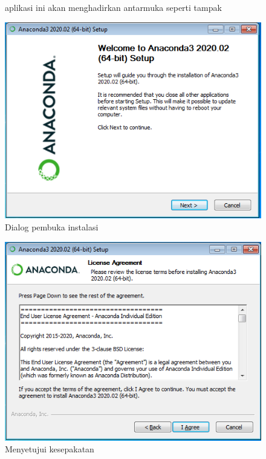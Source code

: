 \begin{figure}aplikasi ini akan menghadirkan antarmuka seperti tampak
  \begin{center}
    \includegraphics[scale=.5]{pics/anacondaInstall1.png}
    \caption{Dialog pembuka instalasi}
    \label{fig:pembuka}
  \end{center}
\end{figure}

\begin{figure}[h!]
  \begin{center}
    \includegraphics[scale=.5]{pics/anacondaInstall2.png}
    \caption{Menyetujui kesepakatan}
    \label{fig:kesepakatan}
  \end{center}
\end{figure}

